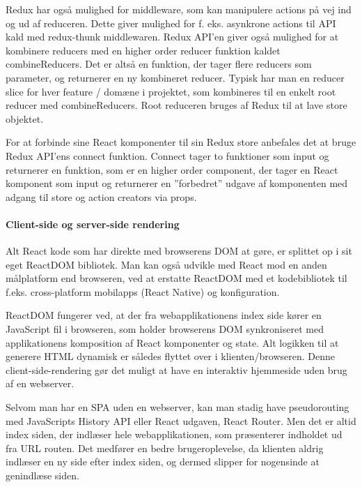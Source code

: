 \documentclass[]{article}
\let\oldparagraph\paragraph
\renewcommand{\paragraph}[1]{\oldparagraph{#1}\mbox{}}
\begin{document}
Redux har også mulighed for middleware, som kan manipulere actions på
vej ind og ud af reduceren. Dette giver mulighed for f. eks. asynkrone
actions til API kald med redux-thunk middlewaren. Redux API'en giver
også mulighed for at kombinere reducers med en higher order reducer
funktion kaldet combineReducers. Det er altså en funktion, der tager
flere reducers som parameter, og returnerer en ny kombineret reducer.
Typisk har man en reducer slice for hver feature / domæne i projektet,
som kombineres til en enkelt root reducer med combineReducers. Root
reduceren bruges af Redux til at lave store objektet.

For at forbinde sine React komponenter til sin Redux store anbefales det
at bruge Redux API'ens connect funktion. Connect tager to funktioner som
input og returnerer en funktion, som er en higher order component, der
tager en React komponent som input og returnerer en ''forbedret'' udgave
af komponenten med adgang til store og action creators via props.

\hypertarget{client-side-og-server-side-rendering}{%
\paragraph{Client-side og server-side
rendering}\label{client-side-og-server-side-rendering}}

Alt React kode som har direkte med browserens DOM at gøre, er splittet
op i sit eget ReactDOM bibliotek. Man kan også udvikle med React mod en
anden målplatform end browseren, ved at erstatte ReactDOM med et
kodebibliotek til f.eks. cross-platform mobilapps (React Native) og
konfiguration.

ReactDOM fungerer ved, at der fra webapplikationens index side kører en
JavaScript fil i browseren, som holder browserens DOM synkroniseret med
applikationens komposition af React komponenter og state. Alt logikken
til at generere HTML dynamisk er således flyttet over i
klienten/browseren. Denne client-side-rendering gør det muligt at have
en interaktiv hjemmeside uden brug af en webserver.

Selvom man har en SPA uden en webserver, kan man stadig have
pseudorouting med JavaScripts History API eller React udgaven, React
Router. Men det er altid index siden, der indlæser hele
webapplikationen, som præsenterer indholdet ud fra URL routen. Det
medfører en bedre brugeroplevelse, da klienten aldrig indlæser en ny
side efter index siden, og dermed slipper for nogensinde at genindlæse
siden.
\end{document}
